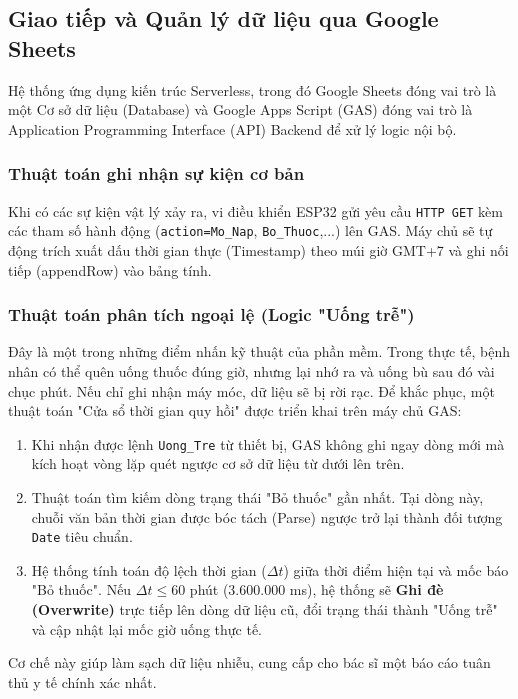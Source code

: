 \documentclass[12pt, a4paper, oneside]{article}
\begin{document}
\subsection{Giao tiếp và Quản lý dữ liệu qua Google Sheets}

Hệ thống ứng dụng kiến trúc Serverless, trong đó Google Sheets đóng vai trò là một Cơ sở dữ liệu (Database) và Google Apps Script (GAS) đóng vai trò là Application Programming Interface (API) Backend để xử lý logic nội bộ.

\subsubsection{Thuật toán ghi nhận sự kiện cơ bản}
Khi có các sự kiện vật lý xảy ra, vi điều khiển ESP32 gửi yêu cầu \texttt{HTTP GET} kèm các tham số hành động (\texttt{action=Mo\_Nap}, \texttt{Bo\_Thuoc},...) lên GAS. Máy chủ sẽ tự động trích xuất dấu thời gian thực (Timestamp) theo múi giờ GMT+7 và ghi nối tiếp (appendRow) vào bảng tính. 

\subsubsection{Thuật toán phân tích ngoại lệ (Logic "Uống trễ")}
Đây là một trong những điểm nhấn kỹ thuật của phần mềm. Trong thực tế, bệnh nhân có thể quên uống thuốc đúng giờ, nhưng lại nhớ ra và uống bù sau đó vài chục phút. Nếu chỉ ghi nhận máy móc, dữ liệu sẽ bị rời rạc. Để khắc phục, một thuật toán "Cửa sổ thời gian quy hồi" được triển khai trên máy chủ GAS:
\begin{enumerate}
    \item Khi nhận được lệnh \texttt{Uong\_Tre} từ thiết bị, GAS không ghi ngay dòng mới mà kích hoạt vòng lặp quét ngược cơ sở dữ liệu từ dưới lên trên.
    \item Thuật toán tìm kiếm dòng trạng thái "Bỏ thuốc" gần nhất. Tại dòng này, chuỗi văn bản thời gian được bóc tách (Parse) ngược trở lại thành đối tượng \texttt{Date} tiêu chuẩn.
    \item Hệ thống tính toán độ lệch thời gian ($\Delta t$) giữa thời điểm hiện tại và mốc báo "Bỏ thuốc". Nếu $\Delta t \le 60$ phút (3.600.000 ms), hệ thống sẽ \textbf{Ghi đè (Overwrite)} trực tiếp lên dòng dữ liệu cũ, đổi trạng thái thành "Uống trễ" và cập nhật lại mốc giờ uống thực tế.
\end{enumerate}
Cơ chế này giúp làm sạch dữ liệu nhiễu, cung cấp cho bác sĩ một báo cáo tuân thủ y tế chính xác nhất.
\end{document}
